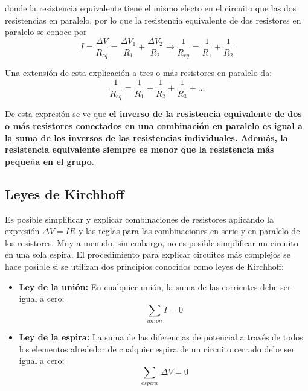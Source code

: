       \PN donde la resistencia equivalente tiene el mismo efecto en el circuito que las dos resistencias en paralelo,
      por lo que la resistencia equivalente de dos resistores en paralelo se conoce por
      \begin{equation*}
        I = \frac{\Delta V}{R_{eq}} = \frac{\Delta V_{1}}{R_{1}} + \frac{\Delta V_{2}}{R_{2}} \rightarrow
        \frac{1}{R_{eq}} = \frac{1}{R_{1}} + \frac{1}{R_{2}}
      \end{equation*}

      \PN Una extensión de esta explicación a tres o más resistores en paralelo da:
      \begin{equation*}
        \frac{1}{R_{eq}} = \frac{1}{R_{1}} + \frac{1}{R_{2}} + \frac{1}{R_{3}} + \dotsc
      \end{equation*}

      \PN De esta expresión se ve que \textbf{el inverso de la resistencia equivalente de dos o más resistores
      conectados en una combinación en paralelo es igual a la suma de los inversos de las resistencias individuales.
      Además, la resistencia equivalente siempre es menor que la resistencia más pequeña en el grupo}.

    \subsection{Leyes de Kirchhoff}
      \PN Es posible simplificar y explicar combinaciones de resistores aplicando la expresión $\Delta V = IR$ y las
      reglas para las combinaciones en serie y en paralelo de los resistores. Muy a menudo, sin embargo, no es posible
      simplificar un circuito en una sola espira. El procedimiento para explicar circuitos más complejos se hace
      posible si se utilizan dos principios conocidos como leyes de Kirchhoff:

      \begin{itemize}
        \item \textbf{Ley de la unión:} En cualquier unión, la suma de las corrientes debe ser igual a cero:
        \begin{equation*}
          \sum_{union} I = 0
        \end{equation*}

        \item \textbf{Ley de la espira:} La suma de las diferencias de potencial a través de todos los elementos
        alrededor de cualquier espira de un circuito cerrado debe ser igual a cero:
        \begin{equation*}
          \sum_{espira} \ \Delta V = 0
        \end{equation*}
      \end{itemize}

